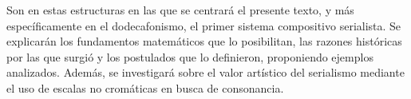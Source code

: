 		Son en estas estructuras en las que se centrará el presente texto, y más específicamente en el dodecafonismo, el primer sistema compositivo serialista. Se explicarán los fundamentos matemáticos que lo posibilitan, las razones históricas por las que surgió y los postulados que lo definieron, proponiendo ejemplos analizados. Además, se investigará sobre el valor artístico del serialismo mediante el uso de escalas no cromáticas en busca de consonancia.
        
        \renewcommand*\contentsname{\vspace{0cm}\begin{Huge}\textbf{Índice general}\end{Huge}\vspace{0cm}}
	\tableofcontents
	\newpage
	$\ $
	\thispagestyle{empty}
	\newpage
	$\ $
	\thispagestyle{empty}
	\newpage